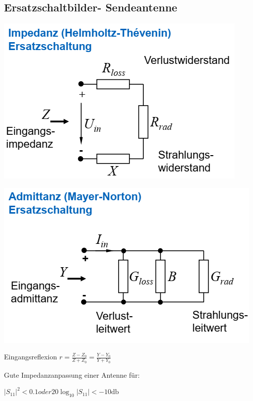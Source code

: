 \documentclass[english]{latex4ei/latex4ei_sheet}
\begin{document}
\begin{sectionbox}
    \subsection{Ersatzschaltbilder- Sendeantenne}
    \includegraphics[width = \textwidth]{./img/antenne_sende_ersatz.png}

    \includegraphics[width = \textwidth]{./img/antenne_sende_ersatz_02.png}


    Eingangsreflexion
    $r = \frac{Z - Z_0}{Z + Z_0} = \frac{Y - Y_0}{Y + Y_0}$

    Gute Impedanzanpassung einer Antenne für:

    $|S_{11}|^2 < 0.1$$ oder $$20\log_{10} |S_{11}| < -10\text{db}$

\end{sectionbox}
\end{document}
